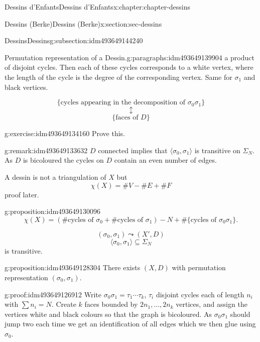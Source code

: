 \documentclass[oneside,10pt,]{book}
\numberwithin{equation}{section}
\begin{document}
\begin{chapterptx}{Dessins d'Enfants}{}{Dessins d'Enfants}{}{}{x:chapter:chapter-dessins}
\begin{sectionptx}{Dessins (Berke)}{}{Dessins (Berke)}{}{}{x:section:sec-dessins}
\begin{subsectionptx}{Dessins}{}{Dessins}{}{}{g:subsection:idm493649144240}
\begin{paragraphs}{Permutation representation of a Dessin.}{g:paragraphs:idm493649139904}
a product of disjoint cycles. Then each of these cycles corresponds to a  white vertex, where the length of the cycle is the degree of the corresponding vertex. Same for \(\sigma_1\) and black vertices.%
\par
%
\begin{equation*}
\{\text{cycles appearing in the decomposition of }\sigma_0\sigma_1\}
\end{equation*}
%
\begin{equation*}
\updownarrow
\end{equation*}
%
\begin{equation*}
\{\text{faces of }D\}
\end{equation*}
%
\begin{inlineexercise}{}{g:exercise:idm493649134160}%
Prove this.%
\end{inlineexercise}
\begin{remark}{}{g:remark:idm493649133632}%
\(D\) connected implies that \(\langle \sigma_0, \sigma_1 \rangle\) is transitive on \(\Sigma_N\). As \(D\) is bicoloured the cycles on \(D\) contain an even number of edges.%
\end{remark}
A dessin is not a triangulation of \(X\) but%
\begin{equation*}
\chi (X) = \#V -  \#E  + \#F
\end{equation*}
proof later.%
\begin{proposition}{}{}{g:proposition:idm493649130096}%
%
\begin{equation*}
\chi(X) = (\#\text{cycles of }\sigma_0+\#\text{cycles of }\sigma_1) - N + \#\{\text{cycles of }\sigma_0\sigma_1\}\text{.}
\end{equation*}
%
\end{proposition}
%
\begin{equation*}
(\sigma_0, \sigma_1) \leadsto (X',D)
\end{equation*}
%
\begin{equation*}
\langle \sigma_0, \sigma_1 \rangle \subseteq \Sigma_N
\end{equation*}
is transitive.%
\begin{proposition}{}{}{g:proposition:idm493649128304}%
There exists \((X,D)\) with permutation representation \((\sigma_0, \sigma_1)\).%
\end{proposition}
\begin{proofptx}{}{g:proof:idm493649126912}
Write \(\sigma_0\sigma_1 = \tau_1 \cdots \tau_k\), \(\tau_i\) disjoint cycles each of length \(n_i\) with \(\sum n_i = N\). Create \(k\) faces bounded by \(2n_1, \ldots, 2n_k\) vertices, and assign the vertices white and black colours so that the graph is bicoloured. As \(\sigma_0\sigma_1\) should jump two each time we get an identification of all edges which we then  glue using \(\sigma_0\).%

\end{proofptx}
\end{paragraphs}
\end{subsectionptx}
\end{sectionptx}
\end{chapterptx}
\end{document}
